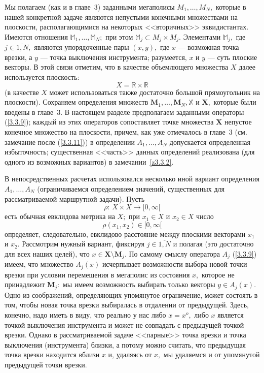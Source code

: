 \documentclass[11pt,twoside,openany]{report}
\newcommand{\ov}{\overline}
\newcommand{\bbm}{{\mathbb M}}
\newcommand{\bbr}{{\mathbb R}}
\newcommand{\bbx}{{\mathbb X}}
\begin{document}
{{Мы полагаем (как и в главе~3) заданными мегаполисы $M_1,\ldots,M_N,$ которые в
нашей конкретной задаче являются непустыми конечными множествами на плоскости,
располагающимися на некоторых <<вторичных>> эквидистантах. Имеются  отношения
$\bbm_1,\ldots,\bbm_N;$ при этом $\bbm_j\subset M_j\times M_j.$ Элементами
$\bbm_j,$ где $j\in \ov{1,N},$ являются упорядоченные пары $(x,y),$ где $x$ ---
возможная точка врезки, а $y$ --- точка выключения инструмента; разумеется, $x$
и $y$ --- суть плоские векторы. В этой связи отметим, что в качестве объемлющего
множества $X$ далее используется плоскость:
$$X = \bbr\times \bbr$$
(в качестве $X$ может использоваться также достаточно большой прямоугольник на
плоскости). Сохраняем определения множеств $\mathbf{M}_1,\ldots,\mathbf{M}_N,
\bbx$ и $\mathbf{X},$ которые были введены в главе~3. В настоящем разделе
предполагаем заданными операторы (\ref{3.3.9}); каждый из этих операторов
сопоставляет точке множества $\mathbf{X}$ непустое конечное множество на
плоскости, причем, как уже отмечалось в главе~3 (см. замечание после
(\ref{3.3.11})) в определении $A_1,\ldots,A_N$ допускается определенная
избыточность; существенная <<часть>> данных определений реализована (для
одного из возможных вариантов) в замечании~\ref{z3.3.2}.

В непосредственных расчетах использовался несколько иной вариант определения
$A_1,\ldots,A_N$ (ограничиваемся определением значений, существенных для
рассматриваемой маршрутной задачи).
Пусть
$$\rho:\,X\times X \longrightarrow [0,\infty[$$
есть обычная евклидова метрика на $X;$ при $x_1\in X$ и $x_2\in X$ число
$$\rho(x_1,x_2)\in [0,\infty[$$
определяет, следовательно, евклидово   расстояние между плоскими векторами
$x_1$ и $x_2.$ Рассмотрим нужный вариант, фиксируя $j\in\ov{1,N}$ и полагая
(это достаточно для всех наших целей), что $x\in \mathbf{X}\setminus
\mathbf{M}_j.$ По самому смыслу оператора $A_j$ (\ref{3.3.9}) имеем, что
множество $A_j(x)$ исчерпывает возможности выбора новой точки врезки при
условии перемещения в мегаполис из состояния $x,$ которое не принадлежит
$\mathbf{M}_j:$ мы имеем возможность выбирать только векторы $y\in A_j(x).$
Одно из соображений, определяющих упомянутое ограничение, может состоять в
том, чтобы новая точка врезки выбиралась в отдалении от предыдущей. Здесь,
конечно, надо иметь в виду, что реально у нас либо $x=x^o,$ либо $x$ является
точкой выключения инструмента и может не совпадать с предыдущей точкой врезки.
Однако в рассматриваемой задаче <<парные>> точка врезки и точка выключения
(инструмента) близки, а потому можно считать, что предыдущая точка врезки
находится вблизи $x$ и, удаляясь от $x,$ мы удаляемся и от упомянутой предыдущей
точки врезки.

}}
\end{document}
